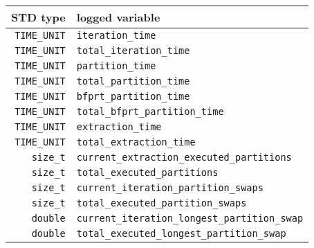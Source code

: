 \begin{table}[!ht]
    \centering
    \begin{tabularx}{\linewidth}{|r|X|}%
    \hline
    STD type & logged variable \\ %
    \hline
    \texttt{TIME\_UNIT} & \texttt{iteration\_time} \\ %
    \hline
    \texttt{TIME\_UNIT} & \texttt{total\_iteration\_time} \\ %
    \hline
    \texttt{TIME\_UNIT} & \texttt{partition\_time} \\ %
    \hline
    \texttt{TIME\_UNIT} & \texttt{total\_partition\_time} \\ %
    \hline
    \texttt{TIME\_UNIT} & \texttt{bfprt\_partition\_time} \\ %
    \hline
    \texttt{TIME\_UNIT} & \texttt{total\_bfprt\_partition\_time} \\ %
    \hline
    \texttt{TIME\_UNIT} & \texttt{extraction\_time} \\ %
    \hline
    \texttt{TIME\_UNIT} & \texttt{total\_extraction\_time} \\ %
    \hline
    \texttt{size\_t} & \texttt{current\_extraction\_executed\_partitions} \\ %
    \hline
    \texttt{size\_t} & \texttt{total\_executed\_partitions} \\ %
    \hline
    \texttt{size\_t} & \texttt{current\_iteration\_partition\_swaps} \\ %
    \hline
    \texttt{size\_t} & \texttt{total\_executed\_partition\_swaps} \\ %
    \hline
    \texttt{double} & \texttt{current\_iteration\_longest\_partition\_swap} \\ %
    \hline
    \texttt{double} & \texttt{total\_executed\_longest\_partition\_swap} \\ %

\end{tabularx}
\end{table}
